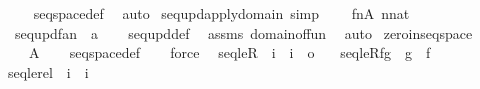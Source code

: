 \begin{isabellebody}
\ \ \ \ \isamarkupfalse%
\ seqspace{\isacharunderscore}{\kern0pt}def\ \isamarkupfalse%
\ auto\isanewline
{}\isamarkupfalse%
%
\endisatagproof
{\isafoldproof}%
%
\isadelimproof
\isanewline
%
\endisadelimproof
\isanewline
{}\isamarkupfalse%
\ seq{\isacharunderscore}{\kern0pt}upd{\isacharunderscore}{\kern0pt}apply{\isacharunderscore}{\kern0pt}domain\ {\isacharbrackleft}{\kern0pt}simp{\isacharbrackright}{\kern0pt}{\isacharcolon}{\kern0pt}\ \isanewline
\ \ \ {\isachardoublequoteopen}f{\isacharcolon}{\kern0pt}n{\isasymrightarrow}A{\isachardoublequoteclose}\ {\isachardoublequoteopen}n{\isasymin}nat{\isachardoublequoteclose}\isanewline
\ \ \ {\isachardoublequoteopen}seq{\isacharunderscore}{\kern0pt}upd{\isacharparenleft}{\kern0pt}f{\isacharcomma}{\kern0pt}a{\isacharparenright}{\kern0pt}{\isacharbackquote}{\kern0pt}n\ {\isacharequal}{\kern0pt}\ a{\isachardoublequoteclose}\isanewline
%
\isadelimproof
\ \ %
\endisadelimproof
%
\isatagproof
{}\isamarkupfalse%
\ seq{\isacharunderscore}{\kern0pt}upd{\isacharunderscore}{\kern0pt}def\ \isamarkupfalse%
\ assms\ domain{\isacharunderscore}{\kern0pt}of{\isacharunderscore}{\kern0pt}fun\ \isamarkupfalse%
\ auto%
\endisatagproof
{\isafoldproof}%
%
\isadelimproof
\isanewline
%
\endisadelimproof
\isanewline
{}\isamarkupfalse%
\ zero{\isacharunderscore}{\kern0pt}in{\isacharunderscore}{\kern0pt}seqspace\ {\isacharcolon}{\kern0pt}\ \isanewline
\ \ \ {\isachardoublequoteopen}{}\ {\isasymin}\ A{\isacharcircum}{\kern0pt}{\isacharless}{\kern0pt}{\isasymomega}{\isachardoublequoteclose}\isanewline
%
\isadelimproof
\ \ %
\endisadelimproof
%
\isatagproof
{}\isamarkupfalse%
\ seqspace{\isacharunderscore}{\kern0pt}def\isanewline
\ \ \isamarkupfalse%
\ force%
\endisatagproof
{\isafoldproof}%
%
\isadelimproof
\isanewline
%
\endisadelimproof
\isanewline
{}\isamarkupfalse%
\isanewline
\ \ seqleR\ {\isacharcolon}{\kern0pt}{\isacharcolon}{\kern0pt}\ {\isachardoublequoteopen}i\ {\isasymRightarrow}\ i\ {\isasymRightarrow}\ o{\isachardoublequoteclose}\ \isanewline
\ \ {\isachardoublequoteopen}seqleR{\isacharparenleft}{\kern0pt}f{\isacharcomma}{\kern0pt}g{\isacharparenright}{\kern0pt}\ {\isasymequiv}\ g\ {\isasymsubseteq}\ f{\isachardoublequoteclose}\isanewline
\isanewline
{}\isamarkupfalse%
\isanewline
\ \ seqlerel\ {\isacharcolon}{\kern0pt}{\isacharcolon}{\kern0pt}\ {\isachardoublequoteopen}i\ {\isasymRightarrow}\ i{\isachardoublequoteclose}\ \isanewline

\end{isabellebody}
